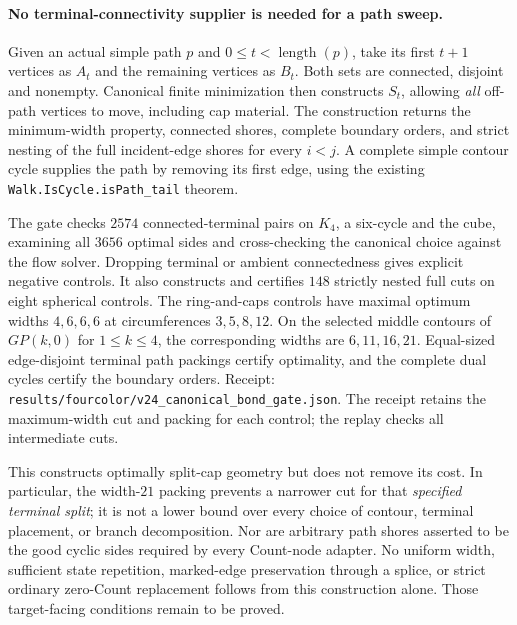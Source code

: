 \paragraph{No terminal-connectivity supplier is needed for a path sweep.}
Given an actual simple path $p$ and $0\leq t<\operatorname{length}(p)$,
take its first $t+1$ vertices as $A_t$ and the remaining vertices as
$B_t$. Both sets are connected, disjoint and nonempty. Canonical finite
minimization then constructs $S_t$, allowing \emph{all} off-path
vertices to move, including cap material. The construction returns
the minimum-width property, connected shores, complete boundary orders,
and strict nesting of the full incident-edge shores for every $i<j$.
A complete simple contour cycle supplies the path by removing its first
edge, using the existing \texttt{Walk.IsCycle.isPath\_tail} theorem.

The gate checks $2574$ connected-terminal pairs on $K_4$, a six-cycle
and the cube, examining all $3656$ optimal sides and cross-checking the
canonical choice against the flow solver. Dropping terminal or ambient
connectedness gives explicit negative controls. It also constructs and
certifies $148$ strictly nested full cuts on eight spherical controls.
The ring-and-caps controls have maximal optimum widths $4,6,6,6$ at
circumferences $3,5,8,12$. On the selected middle contours of
$GP(k,0)$ for $1\leq k\leq4$, the corresponding widths are
$6,11,16,21$. Equal-sized edge-disjoint terminal path packings certify
optimality, and the complete dual cycles certify the boundary orders.
Receipt: \texttt{results/fourcolor/v24\_canonical\_bond\_gate.json}.
The receipt retains the maximum-width cut and packing for each control;
the replay checks all intermediate cuts.

This constructs optimally split-cap geometry but does not remove its
cost. In particular, the width-$21$ packing prevents a narrower cut for
that \emph{specified terminal split}; it is not a lower bound over
every choice of contour, terminal placement, or branch decomposition.
Nor are arbitrary path shores asserted to be the good cyclic sides
required by every Count-node adapter. No uniform width, sufficient
state repetition, marked-edge preservation through a splice, or strict
ordinary zero-Count replacement follows from this construction alone.
Those target-facing conditions remain to be proved.


